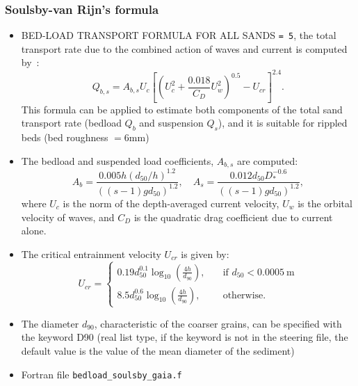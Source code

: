 \subsubsection{Soulsby-van Rijn's formula}
\begin{itemize}
\item {\ttfamily BED-LOAD TRANSPORT FORMULA FOR ALL SANDS} \texttt{= 5}, the total transport rate due to the combined action of waves and current is computed by~\cite{Soulsby97}:
\begin{equation*}
Q_{b,s} = A_{b,s} U_c\left[ \left( U_c^2+\frac{0.018}{C_D} U_w^2\right)^{0.5}-U_{cr}\right]^{2.4}.
\end{equation*}
This formula can be applied to estimate both components of the total sand
transport rate (bedload $Q_b$ and suspension $Q_s$), and it is suitable for rippled beds (bed roughness $=6$mm)

\item The bedload and suspended load coefficients, $A_{b,s}$ are computed:
\begin{equation*}
A_b = \frac{0.005 h \left(d_{50}/h\right)^{1.2}}{\left((s-1)gd_{50}\right)^{1.2}}, \quad A_s = \frac{0.012 d_{50}D_*^{-0.6}}{\left((s-1)gd_{50}\right)^{1.2}},
\end{equation*}
where $U_c$ is the norm of the depth-averaged current velocity, $U_w$ is the orbital velocity of waves, and $C_D$ is the quadratic drag coefficient due to current alone.
\item The critical entrainment velocity $U_{cr}$ is given by:
\begin{equation*}
U_{cr} = \left\{\begin{array}{ll}
\displaystyle
0.19 d_{50}^{0.1}\log_{10}\left(\frac{4h}{d_{90}}\right), & \quad \text{if } d_{50} < 0.0005~\text{m} \\
\displaystyle
8.5 d_{50}^{0.6} \log_{10}\left(\frac{4h}{d_{90}} \right), & \quad \text{otherwise}.
\end{array}
\right.
\end{equation*}
\item The diameter $d_{90}$, characteristic of the coarser grains, can be specified with the keyword {\ttfamily D90} (real list type, if the keyword is not in the steering file, the default value
is the value of the mean diameter of the sediment) %
\item Fortran file \texttt{bedload\_soulsby\_gaia.f}
\end{itemize}


